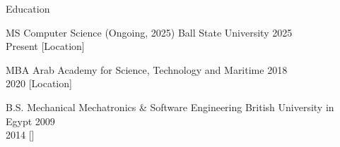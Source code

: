 \begin{rSection}{Education}
    \begin{rESubsection}
        {MS Computer Science (Ongoing, 2025)}
        {Ball State University}
        {2025 \\ Present}
        [Location] %
    \end{rESubsection}

    \begin{rESubsection}
        {MBA}
        {Arab Academy for Science, Technology and Maritime}
        {2018 \\ 2020}
        [Location] %
    \end{rESubsection}

    \begin{rESubsection}
        {B.S. Mechanical Mechatronics & Software Engineering}
        {British University in Egypt}
        {2009 \\ 2014}
        [] %
    \end{rESubsection}
\end{rSection}